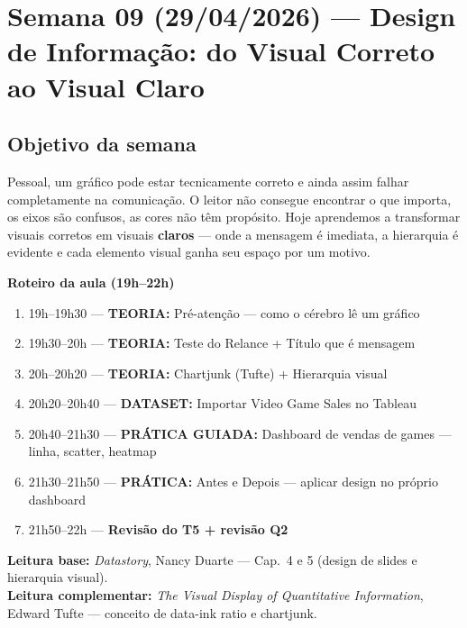 
\chapter{Semana 09 (29/04/2026) — Design de Informação: do Visual Correto ao Visual Claro}

\section{Objetivo da semana}

Pessoal, um gráfico pode estar tecnicamente correto e ainda assim falhar
completamente na comunicação. O leitor não consegue encontrar o que importa,
os eixos são confusos, as cores não têm propósito. Hoje aprendemos a
transformar visuais corretos em visuais \textbf{claros} — onde a mensagem é
imediata, a hierarquia é evidente e cada elemento visual ganha seu espaço
por um motivo.

\begin{BoardBox}
\textbf{Roteiro da aula (19h–22h)}
\begin{enumerate}
  \item 19h–19h30 — \textbf{TEORIA:} Pré-atenção — como o cérebro lê um gráfico
  \item 19h30–20h — \textbf{TEORIA:} Teste do Relance + Título que é mensagem
  \item 20h–20h20 — \textbf{TEORIA:} Chartjunk (Tufte) + Hierarquia visual
  \item 20h20–20h40 — \textbf{DATASET:} Importar Video Game Sales no Tableau
  \item 20h40–21h30 — \textbf{PRÁTICA GUIADA:} Dashboard de vendas de games — linha, scatter, heatmap
  \item 21h30–21h50 — \textbf{PRÁTICA:} Antes e Depois — aplicar design no próprio dashboard
  \item 21h50–22h — \textbf{Revisão do T5 + revisão Q2}
\end{enumerate}
\end{BoardBox}

\begin{NoteBox}
\textbf{Leitura base:} \textit{Datastory}, Nancy Duarte — Cap.\ 4 e 5 (design de slides e hierarquia visual).\\
\textbf{Leitura complementar:} \textit{The Visual Display of Quantitative Information}, Edward Tufte — conceito de data-ink ratio e chartjunk.
\end{NoteBox}

